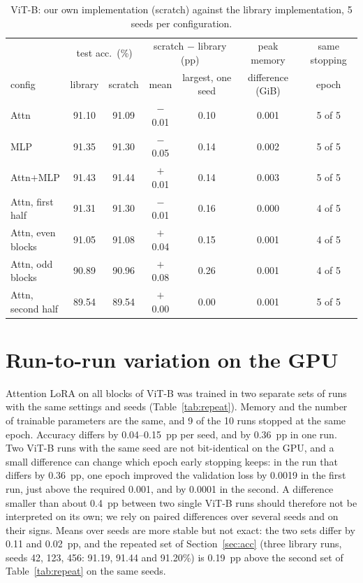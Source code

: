 \begin{table}[H]
\centering\footnotesize
\setlength{\tabcolsep}{4pt}
\begin{tabular}{lcccccc}
\toprule
 & \multicolumn{2}{c}{test acc.\ (\%)} & \multicolumn{2}{c}{scratch $-$ library (pp)} & peak memory & same stopping \\
config & library & scratch & mean & largest, one seed & difference (GiB) & epoch \\
\midrule
Attn & 91.10 & 91.09 & $-$0.01 & 0.10 & 0.001 & 5 of 5 \\
MLP & 91.35 & 91.30 & $-$0.05 & 0.14 & 0.002 & 5 of 5 \\
Attn$+$MLP & 91.43 & 91.44 & $+$0.01 & 0.14 & 0.003 & 5 of 5 \\
Attn, first half & 91.31 & 91.30 & $-$0.01 & 0.16 & 0.000 & 4 of 5 \\
Attn, even blocks & 91.05 & 91.08 & $+$0.04 & 0.15 & 0.001 & 4 of 5 \\
Attn, odd blocks & 90.89 & 90.96 & $+$0.08 & 0.26 & 0.001 & 4 of 5 \\
Attn, second half & 89.54 & 89.54 & $+$0.00 & 0.00 & 0.001 & 5 of 5 \\
\bottomrule
\end{tabular}
\caption{ViT-B: our own implementation (scratch) against the library implementation, 5 seeds per configuration.}
\label{tab:impl}
\end{table}

\section*{Run-to-run variation on the GPU}
\label{app:variation}

Attention LoRA on all blocks of ViT-B was trained in two separate sets of runs with the same settings and seeds
(Table~\ref{tab:repeat}). Memory and the number of trainable parameters are the same, and 9 of the 10 runs stopped
at the same epoch. Accuracy differs by 0.04--0.15~pp per seed, and by 0.36~pp in one run. Two ViT-B runs with the
same seed are not bit-identical on the GPU, and a small difference can change which epoch early stopping keeps: in
the run that differs by 0.36~pp, one epoch improved the validation loss by 0.0019 in the first run, just above the
required 0.001, and by 0.0001 in the second. A difference smaller than about 0.4~pp between two single ViT-B runs
should therefore not be interpreted on its own; we rely on paired differences over several seeds and on their
signs. Means over seeds are more stable but not exact: the two sets differ by 0.11 and 0.02~pp, and the repeated set
of Section~\ref{sec:acc} (three library runs, seeds 42, 123, 456: 91.19, 91.44 and 91.20\%) is 0.19~pp above the
second set of Table~\ref{tab:repeat} on the same seeds.

